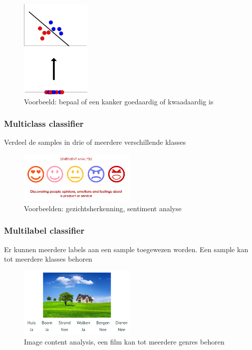 \documentclass{article}
\begin{document}
\begin{figure}[H]
    \centering
    \includegraphics[width=0.3\textwidth]{binary-class.png}
    \caption{Voorbeeld: bepaal of een kanker goedaardig of kwaadaardig is}
\end{figure}

\subsubsection{Multiclass classifier}

Verdeel de samples in drie of meerdere verschillende klasses

\begin{figure}[H]
    \centering
    \includegraphics[width=0.5\textwidth]{multiclass-classifier.png}
    \caption{Voorbeelden: gezichtsherkenning, sentiment analyse}
\end{figure}

\subsubsection{Multilabel classifier}

Er kunnen meerdere labels aan een sample toegewezen worden. 
Een sample kan tot meerdere klasses behoren

\begin{figure}[H]
    \centering
    \includegraphics[width=0.5\textwidth]{multilabel-classifier.png}
    \caption{Image content analysis, een film kan tot meerdere genres behoren}
\end{figure}
\end{document}
